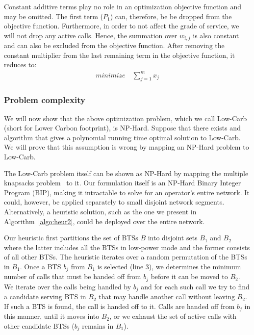 Constant additive terms play no role in an optimization objective function and may be omitted. The first term ($P_1$) can, therefore, be be dropped from the objective function. Furthermore, in order to not affect the grade of service, we will not drop any active calls. Hence, the summation over $w_{i,j}$ is also constant and can also be excluded from the objective function. After removing the constant multiplier from the last remaining term in the objective function, it reduces to:
\begin{align}
\textit{minimize} \quad \sum_{j=1}^{m} x_j
\end{align}

\subsubsection{Problem complexity}
\label{subsubsec:lowcarb:complexity}
We will now show that the above optimization problem, which we call Low-Carb (short for Lower Carbon footprint), is NP-Hard. Suppose that there exists and algorithm that gives a polynomial running time optimal solution to Low-Carb. We will prove that this assumption is wrong by mapping an NP-Hard problem to Low-Carb. 

The Low-Carb problem itself can be shown as NP-Hard by mapping the multiple knapsacks problem~\cite{kellerer:knapsackproblems:2005} to it. Our formulation itself is an NP-Hard Binary Integer Program
(BIP), making it intractable to solve for an
operator's entire network. It could, however, be applied separately to small disjoint network segments. Alternatively, a heuristic solution, such as the one we present in Algorithm~\ref{algo:heur2}, could be deployed over the entire network.

Our heuristic first partitions the set of BTSs $B$ into disjoint sets $B_1$ and $B_2$ where the latter includes all the BTSs in low-power mode and the former consists of all other BTSs. The heuristic iterates over a random permutation of the BTSs in $B_1$. Once a BTS $b_j$ from $B_1$ is selected (line 3), we determines the minimum number of calls that must be handed off from $b_j$ before it can be moved to $B_2$. We iterate over the calls being handled by $b_j$ and for each such call we try to find a candidate serving BTS in $B_2$ that may handle another call without leaving $B_2$. If such a BTS is found, the call is handed off to it. Calls are handed off from $b_j$ in this manner, until it moves into $B_2$, or we exhaust the set of active calls with other candidate BTSs ($b_j$ remains in $B_1$). 

